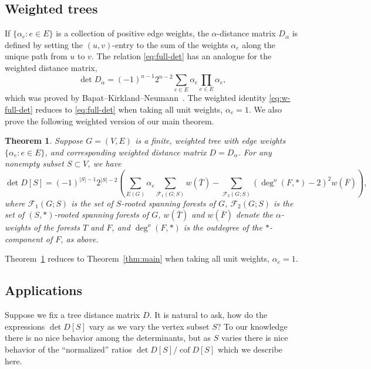 \documentclass{amsart}
\newtheorem{thm}{Theorem}
\theoremstyle{definition}
\newcommand{\Da}{D_{\alpha}}
\DeclareMathOperator{\cof}{cof}
\newcommand{\trees}{\mathcal{F}_1}
\newcommand{\forests}{\mathcal{F}}
\newcommand{\degout}{\deg^o}
\begin{document}
\subsection{Weighted trees}
If $\{\alpha_e : e\in E\}$ is a collection of positive edge weights,  the $\alpha$-distance matrix $\Da$ 
is defined by setting the $(u,v)$-entry to the sum of the weights $\alpha_e$ along the unique path from $u$ to $v$.
The relation \eqref{eq:full-det}
has an analogue for the weighted distance matrix, 
\begin{equation}\label{eq:w-full-det}
	\det \Da = (-1)^{n-1} 2^{n-2} \sum_{e \in E} \alpha_e \prod_{e \in E} \alpha_e ,
\end{equation}
which was proved by Bapat--Kirkland--Neumann~\cite{bapat-kirkland-neumann}.
The weighted identity \eqref{eq:w-full-det} reduces to \eqref{eq:full-det} when taking all unit weights, $\alpha_e = 1$.
We also prove the following weighted version of our main theorem.
\begin{thm}
\label{thm:w-main}
Suppose $G = (V,E)$ is a finite, weighted tree with edge weights $\{\alpha_e : e \in E\}$, and corresponding weighted distance matrix $D = \Da$. For any nonempty subset $S \subset V$, we have
\begin{equation}\label{eq:w-main}
	\det D[S] = (-1)^{|S|-1} 2^{|S|-2} \left( \sum_{E(G)}\alpha_e \sum_{\trees(G;S)} w(\overline{T}) - \sum_{\forests_2(G;S)} (\degout(F,*) - 2)^2 w(\overline{F}) \right),
\end{equation}
where 
$\trees(G;S)$ is the set of $S$-rooted spanning forests of $G$,
$\forests_2(G;S)$ is the set of $(S,*)$-rooted spanning forests of $G$,
$w(\overline{T})$ and $w(\overline{F})$ denote the $\alpha$-weights of the forests $T$ and $F$,
and 
$\degout(F, *)$ is the outdegree of the $*$-component of $F$, as above.
\end{thm}
Theorem~\ref{thm:w-main} reduces to Theorem~\ref{thm:main} when taking all unit weights, $\alpha_e = 1$.

\subsection{Applications}
Suppose we fix a tree distance matrix $D$.
It is natural to ask, how do the expressions $\det D[S]$ vary as we vary the vertex subset $S$? 
To our knowledge there is no nice behavior among the determinants, but  as $S$ varies there is nice behavior of the ``normalized'' ratios $\det D[S] / \cof D[S]$ which we describe here.
\end{document}
